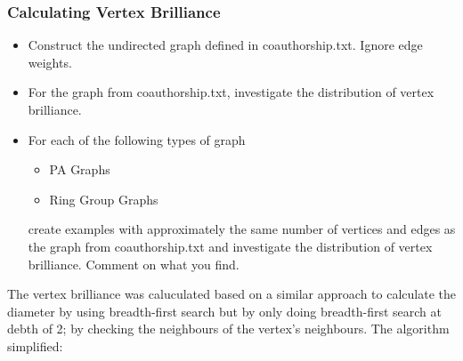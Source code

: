 \documentclass[11pt,a4paper,notitlepage]{article}
\begin{document}
\subsubsection*{Calculating Vertex Brilliance}
\begin{itemize}
    \item Construct the undirected graph defined in coauthorship.txt. Ignore edge weights.
    \item For the graph from coauthorship.txt, investigate the distribution of vertex brilliance. 
    \item For each of the following types of graph
    \begin{itemize}
    \item PA Graphs
    \item Ring Group Graphs 
    \end{itemize}
    create examples with approximately the same number of vertices and edges as the graph from coauthorship.txt and investigate the distribution of vertex brilliance. Comment on what you find.
\end{itemize}
The vertex brilliance was caluculated based on a similar approach to calculate the diameter by using breadth-first search but by only doing breadth-first search at debth of 2; by checking the neighbours of the vertex's neighbours. The algorithm simplified:
\end{document}
